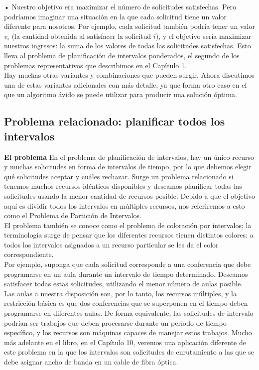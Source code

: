 \documentclass[a4paper, 12pt]{book}
\theoremstyle{dotless}
\begin{document}
    • Nuestro objetivo era maximizar el número de solicitudes satisfechas. Pero podríamos imaginar una situación en la que cada solicitud tiene un valor diferente para nosotros. Por ejemplo, cada solicitud también podría tener un valor $v_i$ (la cantidad obtenida al satisfacer la solicitud $i$), y el objetivo sería maximizar nuestros ingresos: la suma de los valores de todas las solicitudes satisfechas. Esto lleva al problema de planificación de intervalos ponderados, el segundo de los problemas representativos que describimos en el Capítulo 1.\\

Hay muchas otras variantes y combinaciones que pueden surgir. Ahora discutimos una de estas variantes adicionales con más detalle, ya que forma otro caso en el que un algoritmo ávido se puede utilizar para producir una solución óptima.\\

\subsection{Problema relacionado: planificar todos los intervalos}

\textbf{El problema} En el problema de planificación de intervalos, hay un único recurso y muchas solicitudes en forma de intervalos de tiempo, por lo que debemos elegir qué solicitudes aceptar y cuáles rechazar. Surge un problema relacionado si tenemos muchos recursos idénticos disponibles y deseamos planificar todas las solicitudes usando la menor cantidad de recursos posible. Debido a que el objetivo aquí es dividir todos los intervalos en múltiples recursos, nos referiremos a esto como el Problema de Partición de Intervalos.\\

El problema también se conoce como el problema de coloración por intervalos; la terminología surge de pensar que los diferentes recursos tienen distintos colores: a todos los intervalos asignados a un recurso particular se les da el color correspondiente.\\

Por ejemplo, suponga que cada solicitud corresponde a una conferencia que debe programarse en un aula durante un intervalo de tiempo determinado. Deseamos satisfacer todas estas solicitudes, utilizando el menor número de aulas posible. Las aulas a nuestra disposición son, por lo tanto, los recursos múltiples, y la restricción básica es que dos conferencias que se superponen en el tiempo deben programarse en diferentes aulas. De forma equivalente, las solicitudes de intervalo podrían ser trabajos que deben procesarse durante un período de tiempo específico, y los recursos son máquinas capaces de manejar estos trabajos. Mucho más adelante en el libro, en el Capítulo 10, veremos una aplicación diferente de este problema en la que los intervalos son solicitudes de enrutamiento a las que se debe asignar ancho de banda en un cable de fibra óptica. \\
\end{document}
